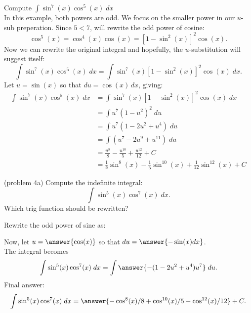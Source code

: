 \documentclass{ximera}
\begin{document}
\begin{example}[example 4]
Compute $\displaystyle{\int \sin^7(x)\cos^5(x) \; dx}$\\

In this example, both powers are odd.  We focus on the smaller power in our $u$-sub preperation.
Since $5 < 7$, will rewrite the odd power of cosine:
\[
\cos^5(x) = \cos^4(x) \cos(x) = \left[1-\sin^2(x)\right]^2 \cos(x).
\]
Now we can rewrite the original integral and hopefully, the $u$-substitution will suggest itself:
\[
\int \sin^7(x)\cos^5(x) \; dx = \int \sin^7(x)\left[1 - \sin^2(x)\right]^2 \cos(x) \; dx.
\]
Let $u = \sin(x)$ so that $du = \cos(x) \, dx$, giving:
\begin{align*}
\int \sin^7(x)\cos^5(x) \; dx &= \int \sin^7(x)\left[1 - \sin^2(x)\right]^2 \cos(x) \; dx\\
   &= \int u^7 (1-u^2)^2 \; du\\
   &= \int u^7(1 - 2u^2 + u^4) \; du\\
   &= \int (u^7 - 2u^9 + u^{11}) \; du\\
  &= \frac{u^8}{8} - \frac{u^{10}}{5} + \frac{u^{12}}{12}+ C \\
  &= \frac18 \sin^8(x) - \frac15 \sin^{10}(x) + \frac{1}{12} \sin^{12}(x)+ C
\end{align*}

\end{example}





\begin{problem}{\color{gray}(problem 4a)}
Compute the indefinite integral:
\[
\int \sin^5(x)\cos^7(x) \; dx.
\]
Which trig function should be rewritten?
\begin{multipleChoice}
\end{multipleChoice}
Rewrite the odd power of sine as:
\begin{multipleChoice}

\end{multipleChoice}

Now, let $u = \answer{\cos(x)}$ so that $du = \answer{-\sin(x) dx}$.\\
The integral becomes
\[
\int \sin^5(x)\cos^7(x) \; dx= \int \answer{-(1-2u^2 + u^4)u^7} \; du.
\]
Final answer:
\[
\int \sin^5(x)\cos^7(x) \; dx= \answer{-\cos^8(x)/8 + \cos^{10}(x)/5 - \cos^{12}(x)/12} + C.
\]
\end{problem}
\end{document}
